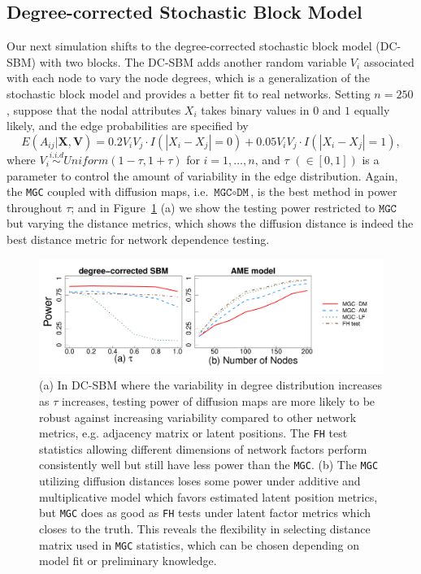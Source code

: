 \documentclass[11pt]{article}
\theoremstyle{definition}
\begin{document}
	\subsection{Degree-corrected Stochastic Block Model}
	Our next simulation shifts to the degree-corrected stochastic block model (DC-SBM) with two blocks. The DC-SBM adds another random variable $V_{i}$ associated with each node to vary the node degrees, which is a generalization of the stochastic block model and provides a better fit to real networks. Setting $n=250$, suppose that the nodal attributes $X_i$ takes binary values in $0$ and $1$ equally likely, and the edge probabilities are specified by  
	\vspace*{-0.4cm}
	\begin{equation}
	E( A_{ij} | \mathbf{X}, \mathbf{V} )  = 0.2 V_{i} V_{j} \cdot I ( |X_{i} - X_{j}| = 0 ) + 0.05 V_{i} V_{j} \cdot I(|X_{i} - X_{j}| = 1),
	\label{eq:tau}
	\end{equation} 
	where $V_{i} \overset{i.i.d}{\sim} Uniform(1 - \tau, 1 + \tau)$ for $i = 1, \ldots, n$, and $\tau$ $(\in [0, 1])$ is a parameter to control the amount of variability in the edge distribution. Again, the \texttt{MGC} coupled with diffusion maps, i.e. $\texttt{MGC} \circ \texttt{DM}$, is the best method in power throughout $\tau$; and in Figure~\ref{fig:combined} (a) we show the testing power restricted to $\texttt{MGC}$ but varying the distance metrics, which shows the diffusion distance is indeed the best distance metric for network dependence testing.
	
	\begin{figure}[ht]
		\centering
		\includegraphics[width=\textwidth]{amedc.pdf}
		\caption{(a) In DC-SBM where the variability in degree distribution increases as $\tau$ increases, testing power of diffusion maps are more likely to be robust against increasing variability compared to other network metrics, e.g. adjacency matrix or latent positions. The \texttt{FH} test statistics allowing different dimensions of network factors perform consistently well but still have less power than the \texttt{MGC}. (b) The \texttt{MGC} utilizing diffusion distances loses some power under additive and multiplicative model which favors estimated latent position metrics, but \texttt{MGC} does as good as \texttt{FH} tests under latent factor metrics which closes to the truth. This reveals the flexibility in selecting distance matrix used in \texttt{MGC} statistics, which can be chosen depending on model fit or preliminary knowledge.}
		\label{fig:combined}
	\end{figure}	
	
\end{document}
